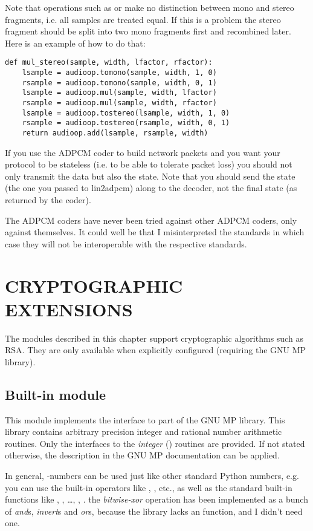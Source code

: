 Note that operations such as  or  make no
distinction between mono and stereo fragments, i.e. all samples are
treated equal.  If this is a problem the stereo fragment should be split
into two mono fragments first and recombined later.  Here is an example
of how to do that:
\bcode\begin{verbatim}
def mul_stereo(sample, width, lfactor, rfactor):
    lsample = audioop.tomono(sample, width, 1, 0)
    rsample = audioop.tomono(sample, width, 0, 1)
    lsample = audioop.mul(sample, width, lfactor)
    rsample = audioop.mul(sample, width, rfactor)
    lsample = audioop.tostereo(lsample, width, 1, 0)
    rsample = audioop.tostereo(rsample, width, 0, 1)
    return audioop.add(lsample, rsample, width)
\end{verbatim}\ecode

If you use the ADPCM coder to build network packets and you want your
protocol to be stateless (i.e. to be able to tolerate packet loss)
you should not only transmit the data but also the state. Note that
you should send the  state (the one you passed to
lin2adpcm) along to the decoder, not the final state (as returned by
the coder).

The ADPCM coders have never been tried against other ADPCM coders,
only against themselves. It could well be that I misinterpreted the
standards in which case they will not be interoperable with the
respective standards.

\chapter{CRYPTOGRAPHIC EXTENSIONS}

The modules described in this chapter support cryptographic algorithms
such as RSA.  They are only available when explicitly configured
(requiring the GNU MP library).

\section{Built-in module }

This module implements the interface to part of the GNU MP library.
This library contains arbitrary precision integer and rational number
arithmetic routines. Only the interfaces to the \emph{integer}
() routines are provided. If not stated
otherwise, the description in the GNU MP documentation can be applied.

In general, -numbers can be used just like other standard
Python numbers, e.g. you can use the built-in operators like \code{+},
\code{*}, etc., as well as the standard built-in functions like
, , \ldots, , .
 the {\it bitwise-xor} operation has been implemented as
a bunch of {\it and}s, {\it invert}s and {\it or}s, because the library
lacks an  function, and I didn't need one.

